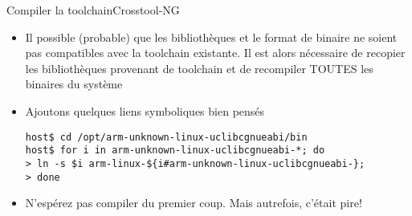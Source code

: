 \begin{frame}[fragile=singleslide]{Compiler la toolchain}{Crosstool-NG}
  \begin{itemize}
      \item Il  possible (probable) que les bibliothèques  et le format
        de  binaire  ne  soient   pas  compatibles  avec  la  toolchain
        existante.    Il  est   alors  nécessaire   de   recopier  les
        bibliothèques  provenant de toolchain  et de  recompiler TOUTES
        les binaires du système
      \item Ajoutons quelques liens symboliques bien pensés
       \begin{lstlisting}[basicstyle=\ttfamily\scriptsize\color{colBasic}]
host$ cd /opt/arm-unknown-linux-uclibcgnueabi/bin
host$ for i in arm-unknown-linux-uclibcgnueabi-*; do 
> ln -s $i arm-linux-${i#arm-unknown-linux-uclibcgnueabi-}; 
> done
	\end{lstlisting}
      \item N'espérez  pas compiler  du premier coup.  Mais autrefois,
        c'était pire!
      \end{itemize}
\end{frame}




